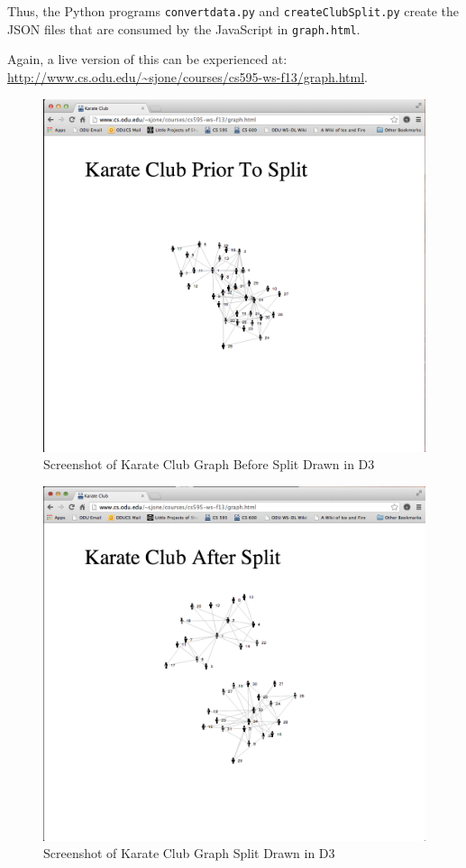 \documentclass[letterpaper,11pt]{article}
\begin{document}
Thus, the Python programs \verb+convertdata.py+ and \verb+createClubSplit.py+ create the JSON files that are consumed by the JavaScript in \verb+graph.html+.

Again, a live version of this can be experienced at:
\url{http://www.cs.odu.edu/~sjone/courses/cs595-ws-f13/graph.html}.

\clearpage
\begin{figure}[h]
\includegraphics[scale=0.4]{club-before-screenie.png}
\caption{Screenshot of Karate Club Graph Before Split Drawn in D3}
\label{fig:club-before}
\end{figure}

\clearpage
\begin{figure}[h]
\includegraphics[scale=0.4]{club-after-screenie.png}
\caption{Screenshot of Karate Club Graph Split Drawn in D3}
\label{fig:club-after}
\end{figure}
\end{document}
